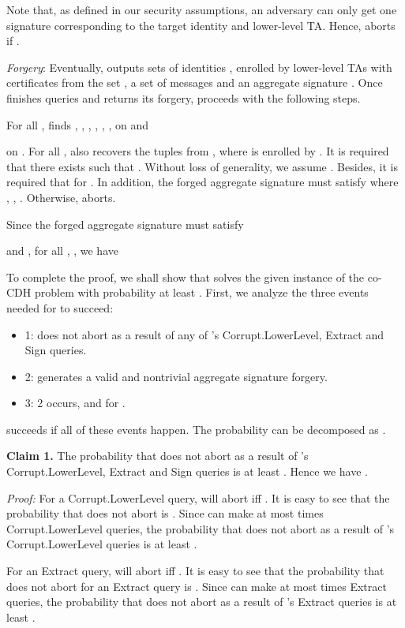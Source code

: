 \documentclass[10pt,journal,compsoc]{IEEEtran}
\begin{document}
 Note that, as defined in our security
assumptions, an adversary can only get one signature corresponding to the target identity and lower-level TA.
 Hence,  aborts if
 .

\smallskip
\noindent \emph{Forgery}: Eventually,  outputs 
sets of identities ,
 enrolled by
 lower-level TAs with certificates from the set
, a set of
 messages  and an aggregate signature
. Once  finishes queries and returns its
forgery,  proceeds with the following steps.

For all ,  finds
, , , ,
 , ,  on
 and

on . For all , 
also recovers the tuples  from , where
 is enrolled by . It is required that there
exists  such that
. Without loss of generality, we
assume . Besides, it is required that for . In addition, the forged aggregate signature must
satisfy
 where
,
, . Otherwise, 
aborts.

Since the forged aggregate signature must satisfy

and
,
for all ,
,
we have



To complete the proof, we shall show that  solves the
given instance of the co-CDH problem with probability at least
. First, we analyze the three events needed for  to succeed:

\begin{itemize}
  \item 1:  does not abort as a result of any of
  's {\sf Corrupt.LowerLevel}, {\sf Extract} and {\sf Sign}
queries.
  \item 2:  generates a valid and nontrivial aggregate signature
forgery.
  \item 3: 2 occurs,  and for .
\end{itemize}

 succeeds if all of these events happen. The
probability  can be
decomposed as .

\medskip\noindent
\textbf{Claim 1.} The probability that  does not abort
as a result of 's {\sf Corrupt.LowerLevel}, {\sf
Extract} and {\sf Sign} queries is at least
. Hence we have .

\emph{Proof:}
For a {\sf Corrupt.LowerLevel} query,  will abort iff
. It is easy to see that the probability
that  does not abort is . Since  can make at most  times {\sf Corrupt.LowerLevel} queries,
the probability that  does not abort as a result of
's {\sf Corrupt.LowerLevel} queries is at least
.

For an {\sf Extract} query,  will abort iff
. It is easy to see that the
probability that  does not abort for an {\sf Extract}
query is . Since  can make at
most  times {\sf Extract} queries, the probability that
 does not abort as a result of 's {\sf
Extract} queries is at least .
\end{document}
